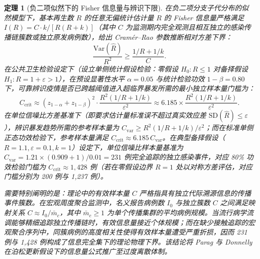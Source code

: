 \documentclass[11pt,a4paper]{article}
\theoremstyle{plain}
\newtheorem{theorem}{定理}
\theoremstyle{definition}
\begin{document}
\begin{theorem}[负二项似然下的 Fisher 信息量与辨识下限]\label{thm:fisher}
在负二项分支子代分布的似然模型下，基本再生数 $R$ 的任意无偏统计估计量 $\hat{R}$ 的 Fisher 信息量严格满足 $I(R) = C \cdot k / [R(R+k)]$（其中 $C$ 为监测期内完全观测且相互独立的感染传播链簇数或独立原发病例数），给出 Cram\'er--Rao 参数推断相对方差下界：
\begin{equation}
\frac{\text{Var}(\hat{R})}{R^2} \ge \frac{1/R + 1/k}{C}.
\label{eq:cramer_cn}
\end{equation}
在公共卫生检验设定下（设立单侧统计假设检验：零假设 $H_0: R \le 1$ 对备择假设 $H_1: R = 1 + \varepsilon > 1$），在预设显著性水平 $\alpha = 0.05$ 与统计检验功效 $1 - \beta = 0.80$ 下，可靠辨识疫情是否已跨越阈值进入超临界暴发所需的最小独立样本量门槛为：
\begin{equation}
C_{\text{crit}} \approx (z_{1-\alpha} + z_{1-\beta})^2 \cdot \frac{R^2(1/R + 1/k)}{\varepsilon^2} \approx 6.185 \times \frac{R^2(1/R + 1/k)}{\varepsilon^2}.
\end{equation}
在单位信噪比方差基准下（即要求估计量标准误不超过真实效应差 $\text{SD}(\hat{R}) \le \varepsilon$），辨识暴发趋势所需的参考样本量为 $C_{\text{var}} \ge R^2(1/R + 1/k)/\varepsilon^2$；而在标准单侧正态功效检验下，参考样本量满足 $C_{\text{crit}} \approx 6.185\, C_{\text{var}}$。在典型备择假设（$R = 1.1, \varepsilon = 0.1, k = 1$）设定下，单位信噪比样本量基准为 $C_{\text{var}} = 1.21 \times (0.909 + 1)/0.01 = 231$ 例完全追踪的独立感染事件，对应 80\% 功效检验门槛为 $C_{\text{crit}} \approx 1,428$ 例（若在零假设边界 $R=1$ 处以对称方差评估，对应门槛分别为 200 例与 1,237 例）。

需要特别阐明的是：理论中的有效样本量 $C$ 严格指具有独立代际溯源信息的传播事件簇数。在宏观周度聚合监测中，名义报告病例数 $I_0$ 与独立簇数 $C$ 之间满足映射关系 $C \approx I_0 / \bar{m}_c$，其中 $\bar{m}_c \ge 1$ 为单个传播集群的平均病例规模。当流行病学流调能够精细追踪独立传播链时，有效信息量接近个体规模；而在缺少接触追踪的宏观聚合序列中，同簇病例的高度相关性使得有效样本量遭受严重折损，因而 231 例与 1,428 例构成了信息完全集下的理论物理下界。该结论将 Parag 与 Donnelly\citep{parag2022fundamental} 在泊松更新假设下的信息量公式推广至过度离散体制。
\end{theorem}
\end{document}
